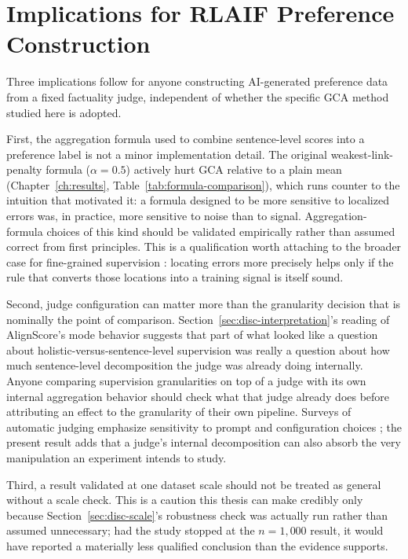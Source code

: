 \section{Implications for RLAIF Preference Construction}
\label{sec:disc-implications}

Three implications follow for anyone constructing AI-generated preference data
from a fixed factuality judge, independent of whether the specific GCA method
studied here is adopted.

First, the aggregation formula used to combine sentence-level scores into a
preference label is not a minor implementation detail. The original
weakest-link-penalty formula ($\alpha=0.5$) actively hurt GCA relative to a plain
mean (Chapter~\ref{ch:results}, Table~\ref{tab:formula-comparison}), which runs
counter to the intuition that motivated it: a formula designed to be more
sensitive to localized errors was, in practice, more sensitive to noise than to
signal. Aggregation-formula choices of this kind should be validated
empirically rather than assumed correct from first principles. This is a
qualification worth attaching to the broader case for fine-grained supervision
\citep{wu2023finegrained}: locating errors more precisely helps only if the rule
that converts those locations into a training signal is itself sound.

Second, judge configuration can matter more than the granularity decision that
is nominally the point of comparison. Section~\ref{sec:disc-interpretation}'s
reading of AlignScore's mode behavior suggests that part of what looked like a
question about holistic-versus-sentence-level supervision was really a question
about how much sentence-level decomposition the judge was already doing
internally. Anyone comparing supervision granularities on top of a judge with
its own internal aggregation behavior should check what that judge already does
before attributing an effect to the granularity of their own pipeline. Surveys of
automatic judging emphasize sensitivity to prompt and configuration choices
\citep{zheng2023judging, gu2024survey}; the present result adds that a judge's
internal decomposition can also absorb the very manipulation an experiment
intends to study.

Third, a result validated at one dataset scale should not be treated as general
without a scale check. This is a caution this thesis can make credibly only
because Section~\ref{sec:disc-scale}'s robustness check was actually run rather
than assumed unnecessary; had the study stopped at the $n=1{,}000$ result, it
would have reported a materially less qualified conclusion than the evidence
supports.

